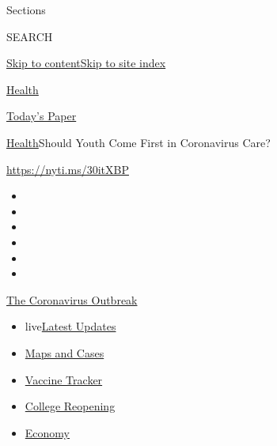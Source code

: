 Sections

SEARCH

\protect\hyperlink{site-content}{Skip to
content}\protect\hyperlink{site-index}{Skip to site index}

\href{https://www.nytimes3xbfgragh.onion/section/health}{Health}

\href{https://myaccount.nytimes3xbfgragh.onion/auth/login?response_type=cookie\&client_id=vi}{}

\href{https://www.nytimes3xbfgragh.onion/section/todayspaper}{Today's
Paper}

\href{/section/health}{Health}\textbar{}Should Youth Come First in
Coronavirus Care?

\url{https://nyti.ms/30itXBP}

\begin{itemize}
\item
\item
\item
\item
\item
\item
\end{itemize}

\href{https://www.nytimes3xbfgragh.onion/news-event/coronavirus?action=click\&pgtype=Article\&state=default\&region=TOP_BANNER\&context=storylines_menu}{The
Coronavirus Outbreak}

\begin{itemize}
\tightlist
\item
  live\href{https://www.nytimes3xbfgragh.onion/2020/08/03/world/coronavirus-covid-19.html?action=click\&pgtype=Article\&state=default\&region=TOP_BANNER\&context=storylines_menu}{Latest
  Updates}
\item
  \href{https://www.nytimes3xbfgragh.onion/interactive/2020/us/coronavirus-us-cases.html?action=click\&pgtype=Article\&state=default\&region=TOP_BANNER\&context=storylines_menu}{Maps
  and Cases}
\item
  \href{https://www.nytimes3xbfgragh.onion/interactive/2020/science/coronavirus-vaccine-tracker.html?action=click\&pgtype=Article\&state=default\&region=TOP_BANNER\&context=storylines_menu}{Vaccine
  Tracker}
\item
  \href{https://www.nytimes3xbfgragh.onion/2020/08/02/us/covid-college-reopening.html?action=click\&pgtype=Article\&state=default\&region=TOP_BANNER\&context=storylines_menu}{College
  Reopening}
\item
  \href{https://www.nytimes3xbfgragh.onion/live/2020/08/03/business/stock-market-today-coronavirus?action=click\&pgtype=Article\&state=default\&region=TOP_BANNER\&context=storylines_menu}{Economy}
\end{itemize}

